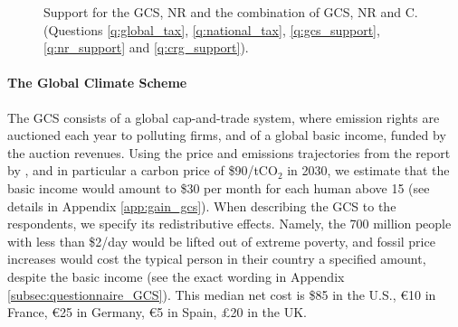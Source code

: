 \begin{figure}[h!]
    \caption[Support for the Global Climate Scheme]{Support for the GCS, NR and the combination of GCS, NR and C. (Questions \ref{q:global_tax}, \ref{q:national_tax}, \ref{q:gcs_support}, \ref{q:nr_support} and \ref{q:crg_support}).%
    }\label{fig:support_binary}
\end{figure}

\begin{tcolorbox}
  \paragraph{The Global Climate Scheme} The GCS consists of a global cap-and-trade system, where emission rights are auctioned each year to polluting firms, and of a global basic income, funded by the auction revenues. 
  Using the price and emissions trajectories from the report by \cite{stern_report_2017}, %
  and in particular a carbon price of \$90/tCO$_\text{2}$ in 2030, we estimate that the basic income would amount to \$30 per month for each human above 15 (see details in Appendix \ref{app:gain_gcs}). %
  When describing the GCS to the respondents, we specify its redistributive effects. Namely, %
  the 700 million people with less than \$2/day would be lifted out of extreme poverty, and fossil price increases would cost the typical person in their country a specified amount, despite the basic income (see the exact wording in Appendix \ref{subsec:questionnaire_GCS}). This median net cost is \$85 in the U.S., \euro{}10 in France, \euro{}25 in Germany, \euro{}5 in Spain, £20 in the UK. %
\end{tcolorbox}

